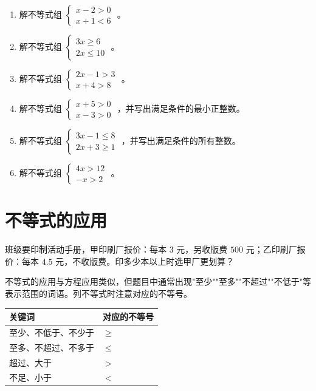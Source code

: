 \begin{practice}


\begin{enumerate}
  \item 解不等式组 $\begin{cases} x - 2 > 0 \\ x + 1 < 6 \end{cases}$ 。
  \item 解不等式组 $\begin{cases} 3x \geq 6 \\ 2x \leq 10 \end{cases}$ 。
  \item 解不等式组 $\begin{cases} 2x - 1 > 3 \\ x + 4 > 8 \end{cases}$ 。
  \item 解不等式组 $\begin{cases} x + 5 > 0 \\ x - 3 > 0 \end{cases}$ ，并写出满足条件的最小正整数。
  \item 解不等式组 $\begin{cases} 3x - 1 \leq 8 \\ 2x + 3 \geq 1 \end{cases}$ ，并写出满足条件的所有整数。
  \item 解不等式组 $\begin{cases} 4x > 12 \\ -x > 2 \end{cases}$ 。
\end{enumerate}


\end{practice}

\section*{不等式的应用}


\begin{explore}


班级要印制活动手册，甲印刷厂报价：每本 $3$ 元，另收版费 $500$ 元；乙印刷厂报价：每本 $4.5$ 元，不收版费。印多少本以上时选甲厂更划算？

\end{explore}

\begin{understand}


不等式的应用与方程应用类似，但题目中通常出现"至少""至多""不超过""不低于"等表示范围的词语。列不等式时注意对应的不等号。

\begin{center}
\begin{tabular}{ll}
\toprule
关键词 & 对应的不等号 \\
\midrule
至少、不低于、不少于 & $\geq$ \\
至多、不超过、不多于 & $\leq$ \\
超过、大于 & $>$ \\
不足、小于 & $<$ \\
\bottomrule
\end{tabular}
\end{center}


\end{understand}

